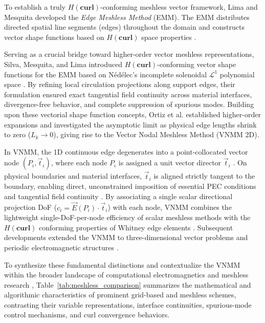 \documentclass[preprint,12pt]{elsarticle}
\begin{document}
To establish a truly $H(\mathbf{curl})$-conforming meshless vector framework, Lima and Mesquita \cite{lima2017edge} developed the \emph{Edge Meshless Method} (EMM). The EMM distributes directed spatial line segments (edges) throughout the domain and constructs vector shape functions based on $H(\mathbf{curl})$ space properties \cite{lima2017edge, lima2016metodos}. 

Serving as a crucial bridge toward higher-order vector meshless representations, Silva, Mesquita, and Lima \cite{silva2018new} introduced $H(\mathbf{curl})$-conforming vector shape functions for the EMM based on N\'ed\'elec's incomplete solenoidal $\mathcal{L}^1$ polynomial space \cite{nedelec1980mixed}. By refining local circulation projections along support edges, their formulation ensured exact tangential field continuity across material interfaces, divergence-free behavior, and complete suppression of spurious modes. Building upon these vectorial shape function concepts, Ortiz et al. \cite{ortiz2021creating, ortiz2021nodal, ortiz2023tese} established higher-order expansions and investigated the asymptotic limit as physical edge lengths shrink to zero ($L_k \to 0$), giving rise to the Vector Nodal Meshless Method (VNMM 2D).

In VNMM, the 1D continuous edge degenerates into a point-collocated vector node $(P_i, \vec{t}_i)$, where each node $P_i$ is assigned a unit vector director $\vec{t}_i$ \cite{ortiz2021nodal, ortiz2023tese}. On physical boundaries and material interfaces, $\vec{t}_i$ is aligned strictly tangent to the boundary, enabling direct, unconstrained imposition of essential PEC conditions and tangential field continuity \cite{ortiz2021nodal, goncalves2025tese}. By associating a single scalar directional projection DoF ($c_i = \vec{E}(P_i) \cdot \vec{t}_i$) with each node, VNMM combines the lightweight single-DoF-per-node efficiency of scalar meshless methods with the $H(\mathbf{curl})$ conforming properties of Whitney edge elements \cite{ortiz2021nodal, goncalves2023vector, goncalves2025tese}. Subsequent developments extended the VNMM to three-dimensional vector problems \cite{goncalves2023vector, goncalves2025tese} and periodic electromagnetic structures \cite{goncalves2026periodic}.

To synthesize these fundamental distinctions and contextualize the VNMM within the broader landscape of computational electromagnetics and meshless research \cite{liu2009mesh, belytschko1994element, atluri2002meshless, slak2018refined}, Table~\ref{tab:meshless_comparison} summarizes the mathematical and algorithmic characteristics of prominent grid-based and meshless schemes, contrasting their variable representations, interface continuities, spurious-mode control mechanisms, and curl convergence behaviors.
\end{document}
